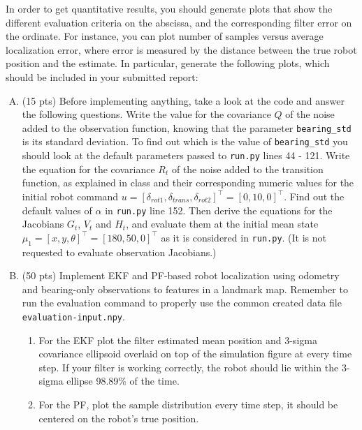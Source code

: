 \documentclass[11pt, oneside, letterpaper]{article}
\begin{document}
In order to get quantitative results, you should generate plots that show the different evaluation criteria on the abscissa, and the corresponding filter error on the ordinate. For instance, you can plot number of samples versus average localization error, where error is measured by the distance between the true robot position and the estimate. In particular, generate the following plots, which should be included in your submitted report:

\begin{enumerate}[A.]
\item (15 pts) %
  Before implementing anything, take a look at the code and answer the following questions.
  Write the value for the covariance  $Q$ of the noise added to the observation function, knowing that the parameter \texttt{bearing\_std} is its standard deviation. To find out which is the value of \texttt{bearing\_std} you should look at the default parameters passed to \texttt{run.py} lines 44 - 121.
 Write the equation for the covariance  $R_t$ of the noise added to the transition function, as explained in class
  and their corresponding numeric values for the initial robot command $u = [\delta_{rot1}, \delta_{trans}, \delta_{rot2}]^\top = [0, 10, 0]^\top$. Find out the default values of $\alpha$ in \texttt{run.py} line 152.
  Then derive the equations for the Jacobians $G_t$, $V_t$ and $H_t$, and evaluate them at the initial mean state
  $\mu_1 = [x,y,\theta]^\top = [180, 50, 0]^\top$ as it is considered in \texttt{run.py}. (It is not requested to evaluate observation Jacobians.)
\item (50 pts) Implement EKF and PF-based robot localization using odometry and bearing-only observations to features in a landmark map.
Remember to run the evaluation command to properly use the common created data file \texttt{evaluation-input.npy}.
  \begin{enumerate}[1.]
  \item For the EKF plot the filter estimated mean position and     3-sigma covariance ellipsoid overlaid on top of the simulation figure at     every time step.  If your filter is working correctly, the robot should     lie within the 3-sigma ellipse 98.89\% of the time.
  \item For the PF, plot the sample distribution every time step, it should be     centered on the robot's true position.
  \end{enumerate}


\end{enumerate}
\end{document}
